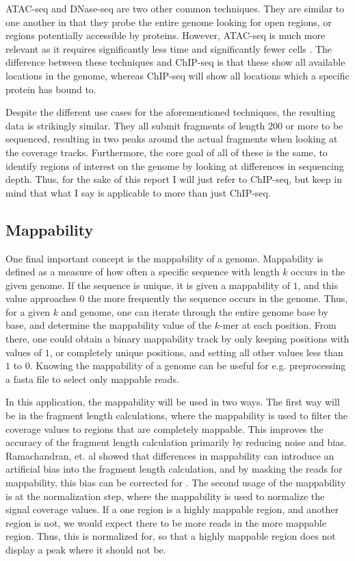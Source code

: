 \documentclass[a4paper]{article}
\begin{document}
    ATAC-seq and DNase-seq are two other common techniques. They are similar to one another in that they probe the entire
    genome looking for open regions, or regions potentially accessible by proteins. However, ATAC-seq is much more relevant
    as it requires significantly less time and significantly fewer cells \cite{buenrostro_transposition_2013}. The difference between these techniques
    and ChIP-seq is that these show all available locations in the genome, whereas ChIP-seq will show all locations which
    a specific protein has bound to.

    Despite the different use cases for the aforementioned techniques, the resulting data is strikingly similar.
    They all submit fragments of length 200 or more to be sequenced, resulting in two peaks around the actual fragments
    when looking at the coverage tracks. Furthermore, the core goal of all of these is the same, to identify regions
    of interest on the genome by looking at differences in sequencing depth. Thus, for the sake of this report I will just
    refer to ChIP-seq, but keep in mind that what I say is applicable to more than just ChIP-seq.

    \subsection{Mappability}
    One final important concept is the mappability of a genome. Mappability is defined as a measure of how often a
    specific sequence with length $k$ occurs in the given genome. If the sequence is unique, it is given a mappability
    of $1$, and this value approaches $0$ the more frequently the sequence occurs in the genome. Thus, for a given $k$ and genome,
    one can iterate through the entire genome base by base, and determine the mappability value of the $k$-mer at each
    position. From there, one could obtain a binary mappability track by only keeping positions with values of $1$, or
    completely unique positions, and setting all other values less than $1$ to $0$. Knowing the mappability of a genome
    can be useful for e.g. preprocessing a fasta file to select only mappable reads.

    In this application, the mappability will be used in two ways. The first way will be in the fragment length calculations,
    where the mappability is used to filter the coverage values to regions that are completely mappable. This improves
    the accuracy of the fragment length calculation primarily by reducing noise and bias. Ramachandran, et. al showed
    that differences in mappability can introduce an artificial bias into the fragment length calculation, and by masking
    the reads for mappability, this bias can be corrected for \cite{ramachandran_masc:_2013}. The second usage of the mappability is at the
    normalization step, where the mappability is used to normalize the signal coverage values. If a one region is a
    highly mappable region, and another region is not, we would expect there to be more reads in the more mappable region.
    Thus, this is normalized for, so that a highly mappable region does not display a peak where it should not be.
\end{document}
